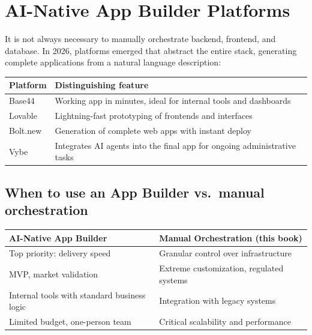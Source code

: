 \section{AI-Native App Builder Platforms}

It is not always necessary to manually orchestrate backend, frontend, and database. In 2026, platforms emerged that abstract the entire stack, generating complete applications from a natural language description:

\begin{center}
\begin{tabularx}{\textwidth}{l X}
\toprule
\textbf{Platform} & \textbf{Distinguishing feature} \\
\midrule
Base44 & Working app in minutes, ideal for internal tools and dashboards \\
Lovable & Lightning-fast prototyping of frontends and interfaces \\
Bolt.new & Generation of complete web apps with instant deploy \\
Vybe & Integrates AI agents into the final app for ongoing administrative tasks \\
\bottomrule
\end{tabularx}
\end{center}

\subsection{When to use an App Builder vs.\ manual orchestration}

\begin{center}
\begin{small}
\begin{tabularx}{\textwidth}{X X}
\toprule
\textbf{AI-Native App Builder} & \textbf{Manual Orchestration (this book)} \\
\midrule
Top priority: delivery speed & Granular control over infrastructure \\
MVP, market validation & Extreme customization, regulated systems \\
Internal tools with standard business logic & Integration with legacy systems \\
Limited budget, one-person team & Critical scalability and performance \\
\bottomrule
\end{tabularx}
\end{small}
\end{center}

